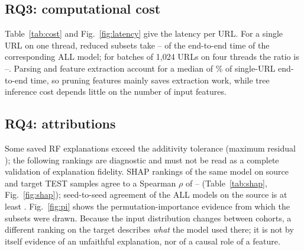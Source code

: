 \begin{table}[t]
\caption{Paired domain-cluster bootstrap contrasts of target-TEST F1 ( replicates; same resampled domains for both arms and all seeds). Top: the four primary contrasts; bottom: secondary cross-dataset contrasts. Per-seed deltas for seeds 17/29/43.}
\label{tab:contrasts}
\centering\scriptsize

\end{table}

\subsection{RQ3: computational cost}
Table~\ref{tab:cost} and Fig.~\ref{fig:latency} give the latency per URL. For a single URL on one thread, reduced subsets take -- of the end-to-end time of the corresponding ALL model; for batches of 1{,}024 URLs on four threads the ratio is --. Parsing and feature extraction account for a median of \% of single-URL end-to-end time, so pruning features mainly saves extraction work, while tree inference cost depends little on the number of input features.

\begin{table}[t]
\caption{Cost of the seed-17 model of every configuration (median $\mu$s per URL; ``rel.'' = end-to-end time relative to ALL of the same source and classifier). Hardware: ,  GB RAM, Python .}
\label{tab:cost}
\centering\scriptsize

\end{table}

\subsection{RQ4: attributions}
Some saved RF explanations exceed the additivity tolerance (maximum residual ); the following rankings are diagnostic and must not be read as a complete validation of explanation fidelity.
SHAP rankings of the same model on source and target TEST samples agree to a Spearman $\rho$ of -- (Table~\ref{tab:shap}, Fig.~\ref{fig:shap}); seed-to-seed agreement of the ALL models on the source is at least . Fig.~\ref{fig:pi} shows the permutation-importance evidence from which the subsets were drawn. Because the input distribution changes between cohorts, a different ranking on the target describes \emph{what} the model used there; it is not by itself evidence of an unfaithful explanation, nor of a causal role of a feature.

